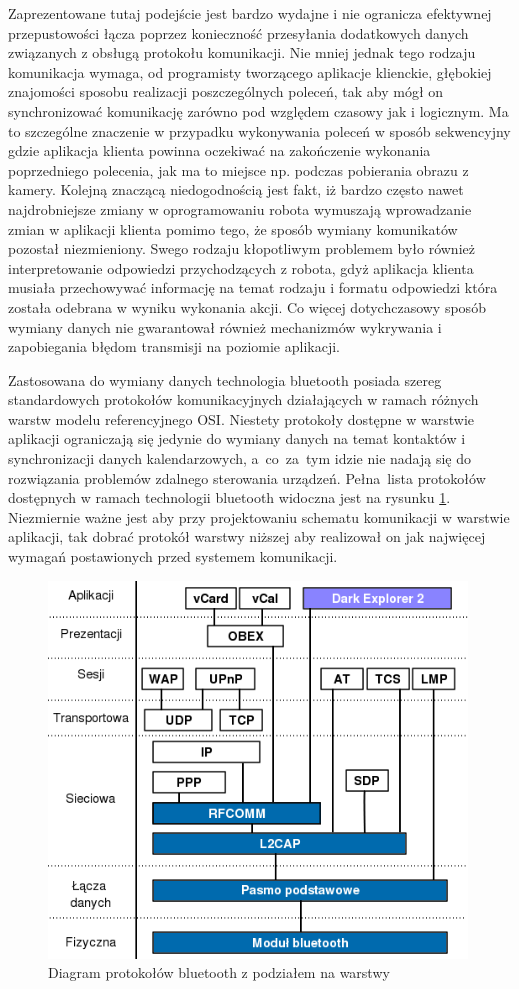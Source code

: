 Zaprezentowane tutaj podejście jest bardzo wydajne i nie ogranicza efektywnej
przepustowości łącza poprzez konieczność przesyłania dodatkowych danych
związanych z obsługą protokołu komunikacji. Nie mniej jednak tego rodzaju
komunikacja wymaga, od programisty tworzącego aplikacje klienckie, głębokiej
znajomości sposobu realizacji poszczególnych poleceń, tak aby mógł on
synchronizować komunikację zarówno pod względem czasowy jak i logicznym. Ma to
szczególne znaczenie w przypadku wykonywania poleceń w sposób sekwencyjny gdzie
aplikacja klienta powinna oczekiwać na zakończenie wykonania poprzedniego
polecenia, jak ma to miejsce np. podczas pobierania obrazu z kamery. Kolejną
znaczącą niedogodnością jest fakt, iż bardzo często nawet najdrobniejsze zmiany w
oprogramowaniu robota wymuszają wprowadzanie zmian w aplikacji klienta pomimo
tego, że sposób wymiany komunikatów pozostał niezmieniony. Swego rodzaju
kłopotliwym problemem było również interpretowanie odpowiedzi przychodzących z
robota, gdyż aplikacja klienta musiała przechowywać informację na temat rodzaju i
formatu odpowiedzi która została odebrana w wyniku wykonania akcji. Co więcej
dotychczasowy sposób wymiany danych nie gwarantował również mechanizmów
wykrywania i zapobiegania błędom transmisji na poziomie aplikacji.

Zastosowana do wymiany danych technologia bluetooth posiada szereg standardowych
protokołów komunikacyjnych działających w ramach różnych warstw modelu
referencyjnego OSI. Niestety protokoły dostępne w warstwie aplikacji ograniczają
się jedynie do wymiany danych na temat kontaktów i synchronizacji danych
kalendarzowych, a~co~za~tym idzie nie nadają się do rozwiązania problemów
zdalnego sterowania urządzeń. Pełna~lista protokołów dostępnych w ramach
technologii bluetooth widoczna jest na rysunku \ref{fig:BtStack}. Niezmiernie
ważne jest aby przy projektowaniu schematu komunikacji w warstwie aplikacji, tak
dobrać protokół warstwy niższej aby realizował on jak najwięcej wymagań
postawionych przed systemem komunikacji.

\begin{figure}[h!]
 \centering 
 \includegraphics[height=100mm]{../images/ch05/btstack.png}
 \caption{Diagram protokołów bluetooth z podziałem na warstwy}
 \label{fig:BtStack}
\end{figure}


